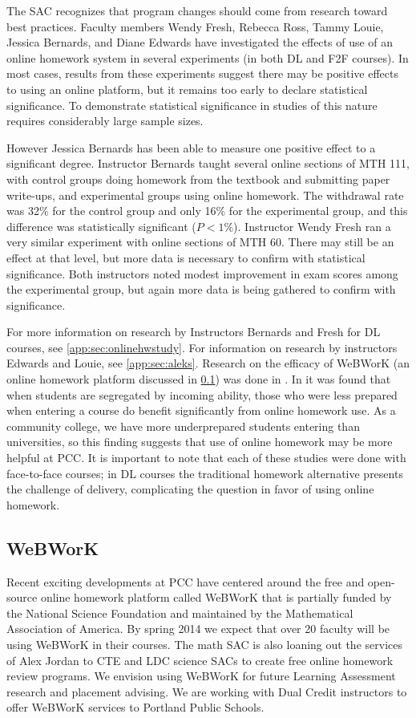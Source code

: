 The SAC recognizes that program changes should come from research toward best practices.  Faculty members Wendy Fresh, Rebecca Ross, Tammy Louie, Jessica Bernards, and Diane Edwards have investigated the effects of use of an online homework system in several experiments (in both DL and F2F courses). In most cases, results from these experiments suggest there may be positive effects to using an online platform, but it remains too early to declare statistical significance. To demonstrate statistical significance in studies of this nature requires considerably large sample sizes. 

However Jessica Bernards has been able to measure one positive effect to a significant degree. Instructor Bernards taught several online sections of MTH 111, with control groups doing homework from the textbook and submitting paper write-ups, and experimental groups using online homework. The withdrawal rate was 32\% for the control group and only 16\% for the experimental group, and this difference was statistically significant ($P<1\%$).  Instructor Wendy Fresh ran a very similar experiment with online sections of MTH 60. There may still be an effect at that level, but more data is necessary to confirm with statistical significance. Both instructors noted modest improvement in exam scores among the experimental group, but again more data is being gathered to confirm with significance.

For more information on research by Instructors Bernards and Fresh for DL courses, see \vref{app:sec:onlinehwstudy}. For information on research by instructors Edwards and Louie, see \vref{app:sec:aleks}. Research on the efficacy of WeBWorK (an online homework platform discussed in \ref{other:sec:webwork}) was done in \cite{focuswebwork}.  In \cite{brewer} it was found that when students are segregated by incoming ability, those who were less prepared when entering a course do benefit significantly from online homework use. As a community college, we have more underprepared students entering than universities, so this finding suggests that use of online homework may be more helpful at PCC. It is important to note that each of these studies were done with face-to-face courses; in DL courses the traditional homework alternative presents the challenge of delivery, complicating the question in favor of using online homework.

\subsection{WeBWorK}\label{other:sec:webwork}
Recent exciting developments at PCC have centered around the free and open-source online homework platform called WeBWorK that is partially funded by the National Science Foundation and maintained by the Mathematical Association of America. By spring 2014 we expect that over 20 faculty will be using WeBWorK in their courses. The math SAC is also loaning out the services of Alex Jordan to CTE and LDC science SACs to create free online homework review programs. We envision using WeBWorK for future Learning Assessment research and placement advising. We are working with Dual Credit instructors to offer WeBWorK services to Portland Public Schools.

